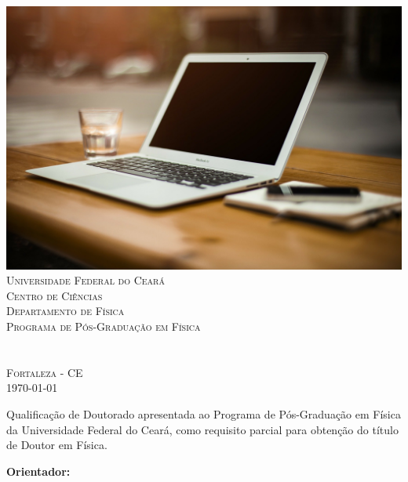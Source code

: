 \thispagestyle{empty}
\begin{center}
	\includegraphics[scale=0.3]{../Imagens/laptop} \\ %
	{\Large \textsc{Universidade Federal do Ceará}} \\
	{\large \textsc{Centro de Ciências}} \\
	{\large \textsc{Departamento de Física}} \\
	{\large \textsc{Programa de Pós-Graduação em Física}} \\
	\vspace{35mm}
	\titulo \\
	\vspace{60mm}
	{\large \textsc{\autor}} \\
	\vspace{10mm}
	{\large \textsc{Fortaleza - CE}} \\
	\today
\end{center}
	
\newpage
	
\begin{center}
	{\LARGE \textsc{\autor}}
\end{center}

\vspace{35mm}
{\centering \titulo}
\vspace{40mm}

\begin{flushright}
	\begin{minipage}{80mm}
		Qualificação de Doutorado apresentada ao Programa de Pós-Graduação em Física da Universidade Federal do Ceará, como requisito parcial para obtenção do título de Doutor em Física. 
		\begin{flushright} \textbf{Orientador:} \orientador \end{flushright}
	\end{minipage}
\end{flushright}
\vspace{60mm}

